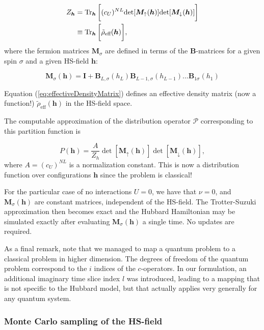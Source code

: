\begin{equation}\label{eq:effectiveDensityMatrix}
\begin{split}
Z_{\bm h} &=  \operatorname{Tr}_{\bm h} \bigg[ (c_U)^{NL} \text{det} [ \bm M_\uparrow (\bm h)] \text{det} [  \bm M_\downarrow (\bm h) ] \bigg] \\
&\equiv  \operatorname{Tr}_{\bm h} \bigg[  \tilde{\rho}_{\text{eff}} (\bm h) \bigg] ,
\end{split}
\end{equation}
where the fermion matrices $\bm M_\sigma$ are defined in terms of the $\bm B$-matrices for a given spin $\sigma$ and a given HS-field $\bm h$:

\begin{equation}
\bm M_\sigma (\bm h) = \bm I + \bm B_{L,\sigma} ( h_L) \bm B_{L-1,\sigma} ( h_{L-1}) ... \bm B_{1\sigma} ( h_1)
\end{equation}

Equation (\ref{eq:effectiveDensityMatrix}) defines an effective density matrix (now a function!) $\tilde{\rho}_{\text{eff}} (\bm h)$ in the HS-field space.

The computable approximation of the distribution operator $\mathcal{P}$ corresponding to this partition function is

\begin{equation}
P(\bm h) = \frac{A}{Z_h} \det [ \bm M_{\uparrow}(\bm h) ] \det [ \bm M_{\downarrow}(\bm h) ] ,
\end{equation}
where $A = (c_U)^{NL}$ is a normalization constant. This is now a distribution function over configurations $\bm h$ since the problem is classical!

For the particular case of no interactions $U = 0$, we have that $\nu = 0$, and $\bm M_\sigma (\bm h)$ are constant matrices, independent of the HS-field. The Trotter-Suzuki approximation then becomes exact and the Hubbard Hamiltonian may be simulated exactly after evaluating $\bm M_\sigma (\bm h)$ a single time. No updates are required.

As a final remark, note that we managed to map a quantum problem to a classical problem in higher dimension. The degrees of freedom of the quantum problem correspond to the $i$ indices  of the $c$-operators. In our formulation, an additional imaginary time slice index $l$ was introduced, leading to a mapping that is not specific to the Hubbard model, but that actually applies very generally for any quantum system.

\subsubsection{Monte Carlo sampling of the HS-field}

